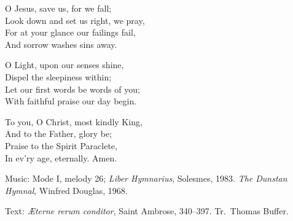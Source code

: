 \hymn



\begin{underhymnverse}
  O Jesus, save us, for we fall;\\
  Look down and set us right, we pray,\\
  For at your glance our failings fail,\\
  And sorrow washes sins away.

  O Light, upon our senses shine,\\
  Dispel the sleepiness within;\\
  Let our first words be words of you;\\
  With faithful praise our day begin.

  To you, O Christ, most kindly King,\\
  And to the Father, glory be;\\
  Praise to the Spirit Paraclete,\\
  In ev'ry age, eternally.
  Amen.

\end{underhymnverse}


\begin{hymnsource}
Music: Mode I, melody 26; \emph{Liber Hymnarius}, Solesmes, 1983. \emph{The Dunstan Hymnal}, Winfred Douglas, 1968.

Text: \emph{Æterne rerum conditor}, Saint Ambrose, 340--397. Tr.~Thomas Buffer.
\end{hymnsource}
